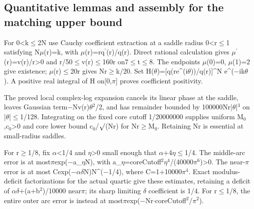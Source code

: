\documentclass[11pt,a4paper]{article}
\begin{document}
\subsection{Quantitative lemmas and assembly for the matching upper bound}
For 0<k\ensuremath{\leq}2N use Cauchy coefficient extraction at a saddle radius 0<r\ensuremath{\leq}1 satisfying N\ensuremath{\mu}(r)=k, with \ensuremath{\mu}(r)=rq\ensuremath{^{\prime}}(r)/q(r). Direct rational calculation gives \ensuremath{\mu}\ensuremath{^{\prime}}(r)=v(r)/r>0 and r/50\ensuremath{\leq}v(r)\ensuremath{\leq}160r on7\ensuremath{\leq}t\ensuremath{\leq}8. The endpoints \ensuremath{\mu}(0)=0, \ensuremath{\mu}(1)=2 give existence; \ensuremath{\mu}(r)\ensuremath{\leq}20r gives Nr\ensuremath{\geq}k/20. Set H(\ensuremath{\theta})=[q(re\textasciicircum{}(i\ensuremath{\theta}))/q(r)]\textasciicircum{}N e\textasciicircum{}(\ensuremath{-}ik\ensuremath{\theta}). A positive real integral of H on[0,\ensuremath{\pi}] proves coefficient positivity.

The proved local complex-log expansion cancels its linear phase at the saddle, leaves Gaussian term\ensuremath{-}Nv(r)\ensuremath{\theta}\ensuremath{^2}/2, and has remainder bounded by 100000Nr|\ensuremath{\theta}|\ensuremath{^3} on |\ensuremath{\theta}|\ensuremath{\leq}1/128. Integrating on the fixed core cutoff 1/20000000 supplies uniform M\ensuremath{_0},c\ensuremath{_0}>0 and core lower bound c\ensuremath{_0}/\ensuremath{\surd}(Nr) for Nr\ensuremath{\geq}M\ensuremath{_0}. Retaining Nr is essential at small-radius saddles.

For r\ensuremath{\geq}1/8, fix \ensuremath{\alpha}<1/4 and \ensuremath{\eta}>0 small enough that \ensuremath{\alpha}+4\ensuremath{\eta}\ensuremath{\leq}1/4. The middle-arc error is at most\ensuremath{\pi}exp(\ensuremath{-}a\_\ensuremath{\eta}N), with a\_\ensuremath{\eta}=coreCutoff\ensuremath{^2}\ensuremath{\eta}\ensuremath{^4}/(40000\ensuremath{\pi}\ensuremath{^6})>0. The near-\ensuremath{\pi} error is at most Cexp(\ensuremath{-}\ensuremath{\alpha}\ensuremath{\delta}N)N\textasciicircum{}(\ensuremath{-}1/4), where C=1+10000\ensuremath{\pi}\ensuremath{^4}. Exact modulus-deficit factorizations for the actual quartic give these estimates, retaining a deficit of \ensuremath{\alpha}\ensuremath{\delta}+(a+b\ensuremath{^2})/10000 near\ensuremath{\pi}; its sharp limiting \ensuremath{\delta} coefficient is 1/4. For r\ensuremath{\leq}1/8, the entire outer arc error is instead at most\ensuremath{\pi}exp(\ensuremath{-}Nr\ensuremath{\cdot}coreCutoff\ensuremath{^2}/\ensuremath{\pi}\ensuremath{^2}).
\end{document}
